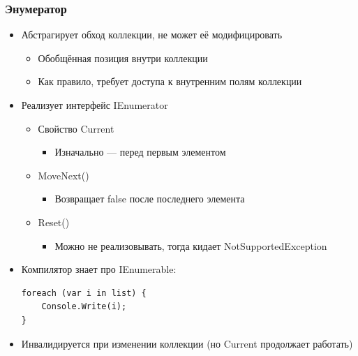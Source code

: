 \documentclass{../../slides-style}
\begin{document}
    \begin{frame}[fragile]
        \frametitle{Энумератор}
        \begin{itemize}
            \item Абстрагирует обход коллекции, не может её модифицировать
            \begin{itemize}
                \item Обобщённая позиция внутри коллекции
                \item Как правило, требует доступа к внутренним полям коллекции
            \end{itemize}
            \item Реализует интерфейс IEnumerator
            \begin{itemize}
                \item Свойство Current
                \begin{itemize}
                    \item Изначально --- перед первым элементом
                \end{itemize}
                \item MoveNext()
                \begin{itemize}
                    \item Возвращает false после последнего элемента
                \end{itemize}
                \item Reset()
                \begin{itemize}
                    \item Можно не реализовывать, тогда кидает NotSupportedException
                \end{itemize}
            \end{itemize}
            \item Компилятор знает про IEnumerable:
            \begin{verbatim}
foreach (var i in list) { 
    Console.Write(i); 
}
            \end{verbatim}
            \item Инвалидируется при изменении коллекции (но Current продолжает работать)
        \end{itemize}
    \end{frame}
\end{document}
